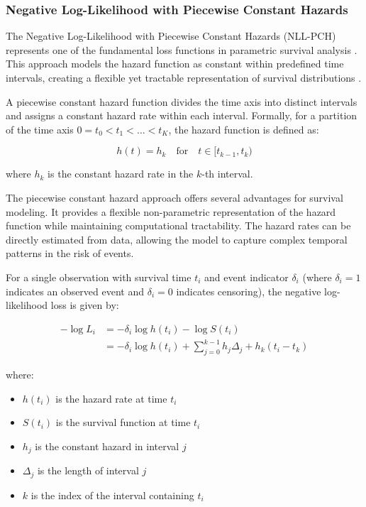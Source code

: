 \subsubsection{Negative Log-Likelihood with Piecewise Constant Hazards}

The Negative Log-Likelihood with Piecewise Constant Hazards (NLL-PCH) represents one of the fundamental loss functions in parametric survival analysis \parencite{ibrahim2001}. This approach models the hazard function as constant within predefined time intervals, creating a flexible yet tractable representation of survival distributions \parencite{kleinbaum2012}.

\begin{definitionbox}[title=Piecewise Constant Hazard Function]
  A piecewise constant hazard function divides the time axis into distinct intervals and assigns a constant hazard rate within each interval. Formally, for a partition of the time axis $0 = t_0 < t_1 < \ldots < t_K$, the hazard function is defined as:

  \begin{equation}
    h(t) = h_k \quad \text{for} \quad t \in [t_{k-1}, t_k)
  \end{equation}

  where $h_k$ is the constant hazard rate in the $k$-th interval.
\end{definitionbox}

The piecewise constant hazard approach offers several advantages for survival modeling. It provides a flexible non-parametric representation of the hazard function while maintaining computational tractability. The hazard rates can be directly estimated from data, allowing the model to capture complex temporal patterns in the risk of events.

\begin{equationbox}[title=NLL-PCH Loss Function]
  For a single observation with survival time $t_i$ and event indicator $\delta_i$ (where $\delta_i = 1$ indicates an observed event and $\delta_i = 0$ indicates censoring), the negative log-likelihood loss is given by:

  \begin{align}
    -\log L_i &= -\delta_i \log h(t_i) - \log S(t_i)\\
    &= -\delta_i \log h(t_i) + \sum_{j=0}^{k-1} h_j \Delta_j + h_k (t_i - t_k)
  \end{align}

  where:
  \begin{itemize}
  \item $h(t_i)$ is the hazard rate at time $t_i$
  \item $S(t_i)$ is the survival function at time $t_i$
  \item $h_j$ is the constant hazard in interval $j$
  \item $\Delta_j$ is the length of interval $j$
  \item $k$ is the index of the interval containing $t_i$
  \end{itemize}
\end{equationbox}

